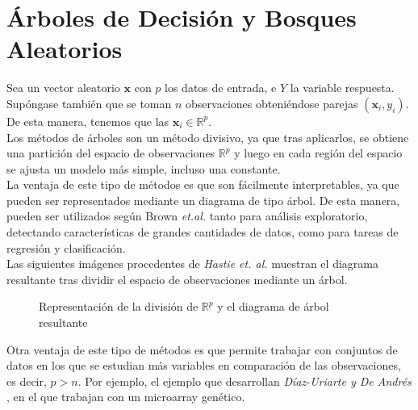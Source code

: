 \newpage
\section{ Árboles de Decisión y Bosques Aleatorios}
\noindent Sea un vector aleatorio $\textbf{x}$ con $p$ los datos de entrada, e $Y$ la variable respuesta. Supóngase también que se toman $n$ observaciones obteniéndose parejas $(\textbf{x}_i,y_i)$. De esta manera, tenemos que las $\textbf{x}_i\in \mathbb{R}^p$.\\
Los métodos de árboles son un método divisivo, ya que tras aplicarlos, se obtiene una partición del espacio de observaciones $\mathbb{R}^p$ y luego en cada región del espacio se ajusta un modelo más simple, incluso una constante.\\
La ventaja de este tipo de métodos es que son fácilmente interpretables, ya que pueden ser representados mediante un diagrama de tipo árbol. De esta manera, pueden ser utilizados según Brown \textit{et.al.}\cite{Brown 2004} tanto para análisis exploratorio, detectando características de grandes cantidades de datos, como para tareas de regresión y clasificación. \\ 
Las  siguientes imágenes procedentes de \textit{Hastie et. al.}\cite{Hastie 2001} muestran el diagrama resultante tras dividir el espacio de observaciones mediante un árbol.

\begin{figure}[h]
 \centering
 \caption{Representación de la división de $\mathbb{R}^p$ y el diagrama de árbol resultante}
 \label{f:MARC1}
\end{figure}

\noindent Otra ventaja de este tipo de métodos es que permite trabajar con conjuntos de datos en los que se estudian más variables en comparación de las observaciones, es decir, $p > n$. Por ejemplo, el ejemplo que desarrollan \textit{Díaz-Uriarte y De Andrés} \cite{Diaz 2006}, en el que trabajan con un microarray genético. 

